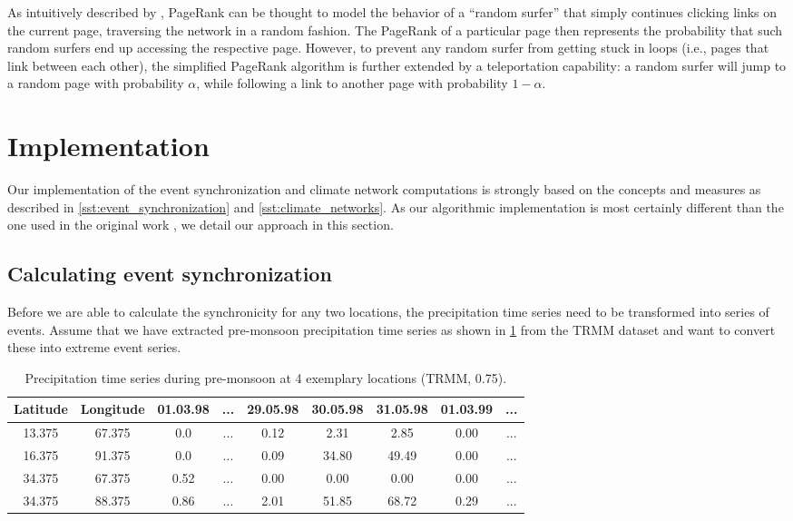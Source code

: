 As intuitively described by \citet{Page.1999}, PageRank can be thought to model the behavior of a ``random surfer'' that simply continues clicking links on the current page, traversing the network in a random fashion. The PageRank of a particular page then represents the probability that such random surfers end up accessing the respective page. However, to prevent any random surfer from getting stuck in loops (i.e., pages that link between each other), the simplified PageRank algorithm is further extended by a teleportation capability: a random surfer will jump to a random page with probability $\alpha$, while following a link to another page with probability $1-\alpha$.

\section{Implementation}
\label{st:event_sync_implementation}
Our implementation of the event synchronization and climate network computations is strongly based on the concepts and measures as described in \cref{sst:event_synchronization} and \cref{sst:climate_networks}. As our algorithmic implementation is most certainly different than the one used in the original work \citep{Stolbova.2015}, we detail our approach in this section.

\subsection{Calculating event synchronization}
\label{sst:event_sync_calculation}
Before we are able to calculate the synchronicity for any two locations, the precipitation time series need to be transformed into series of events. Assume that we have extracted pre-monsoon precipitation time series as shown in \cref{tab:example_rainfall_ts} from the TRMM dataset and want to convert these into extreme event series.

\begin{table}[h]
  \centering
  \begin{tabular}{ cc|ccccccc }
    \toprule
    \textbf{Latitude} & \textbf{Longitude} & \textbf{01.03.98} & \textbf{...} & \textbf{29.05.98} & \textbf{30.05.98} & \textbf{31.05.98} & \textbf{01.03.99} & ...\\
    \midrule
    13.375 & 67.375 & 0.0  & ... & 0.12 & 2.31  & 2.85  & 0.00 & ... \\
    16.375 & 91.375 & 0.0  & ... & 0.09 & 34.80 & 49.49 & 0.00 & ... \\
    34.375 & 67.375 & 0.52 & ... & 0.00 & 0.00  & 0.00  & 0.00 & ... \\
    34.375 & 88.375 & 0.86 & ... & 2.01 & 51.85 & 68.72 & 0.29 & ... \\
    \bottomrule
  \end{tabular}
  \caption{Precipitation time series during pre-monsoon at 4 exemplary locations (TRMM, 0.75\degree).}
  \label{tab:example_rainfall_ts}
\end{table}

